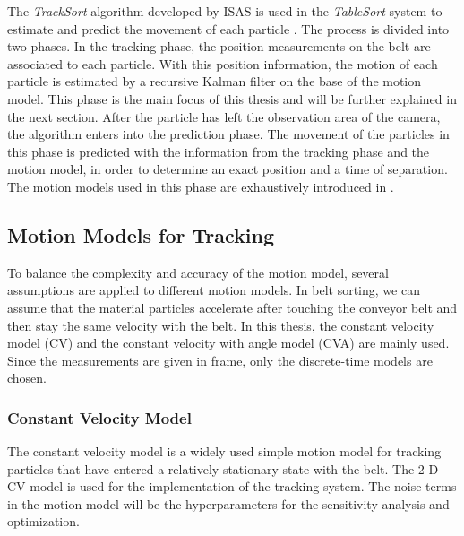 The \textit{TrackSort} algorithm developed by ISAS is used in the \textit{TableSort} system to estimate and predict the movement of each particle \cite{pfaff2015tracksort}. The process is divided into two phases. In the tracking phase, the position measurements on the belt are associated to each particle. With this position information, the motion of each particle is estimated by a recursive Kalman filter on the base of the motion model. This phase is the main focus of this thesis and will be further explained in the next section. After the particle has left the observation area of the camera, the algorithm enters into the prediction phase. The movement of the particles in this phase is predicted with the information from the tracking phase and the motion model, in order to determine an exact position and a time of separation. The motion models used in this phase are exhaustively introduced in \cite{pfaff2019multitarget}.

\subsection{Motion Models for Tracking}\label{Motion Models}

To balance the complexity and accuracy of the motion model, several assumptions are applied to different motion models. In belt sorting, we can assume that the material particles accelerate after touching the conveyor belt and then stay the same velocity with the belt. In this thesis, the constant velocity model (CV) and the constant velocity with angle model (CVA) are mainly used. Since the measurements are given in frame, only the discrete-time models are chosen.

\subsubsection{Constant Velocity Model}

The constant velocity model is a widely used simple motion model for tracking particles that have entered a relatively stationary state with the belt. The 2-D CV model is used for the implementation of the tracking system. The noise terms in the motion model will be the hyperparameters for the sensitivity analysis and optimization.

